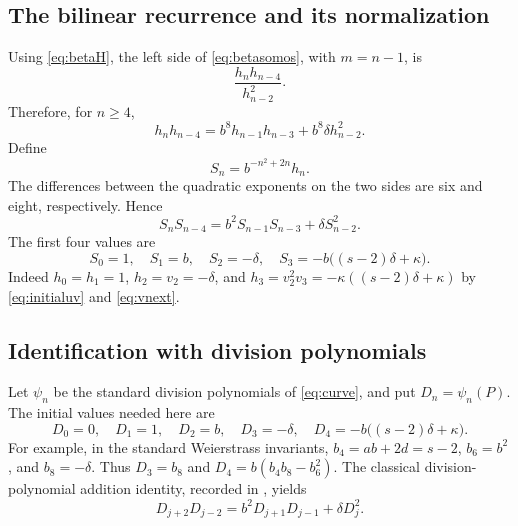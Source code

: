 \documentclass[11pt,letterpaper]{article}
\numberwithin{equation}{section}
\theoremstyle{definition}
\theoremstyle{remark}
\begin{document}
\subsection{The bilinear recurrence and its normalization}
Using \eqref{eq:betaH}, the left side of \eqref{eq:betasomos}, with
$m=n-1$, is
\[
 \frac{h_nh_{n-4}}{h_{n-2}^2}.
\]
Therefore, for $n\ge4$,
\begin{equation}\label{eq:hSomos}
 h_nh_{n-4}=b^8h_{n-1}h_{n-3}+b^8\delta h_{n-2}^2.
\end{equation}
Define
\begin{equation}\label{eq:S}
 S_n=b^{-n^2+2n}h_n.
\end{equation}
The differences between the quadratic exponents on the two sides are
six and eight, respectively. Hence
\begin{equation}\label{eq:SSomos}
 S_nS_{n-4}=b^2S_{n-1}S_{n-3}+\delta S_{n-2}^2.
\end{equation}
The first four values are
\begin{equation}\label{eq:Sinit}
 S_0=1,\quad S_1=b,\quad S_2=-\delta,\quad
 S_3=-b\bigl((s-2)\delta+\kappa\bigr).
\end{equation}
Indeed $h_0=h_1=1$, $h_2=v_2=-\delta$, and
$h_3=v_2^2v_3=-\kappa((s-2)\delta+\kappa)$ by
\eqref{eq:initialuv} and \eqref{eq:vnext}.

\subsection{Identification with division polynomials}
Let $\psi_n$ be the standard division polynomials of \eqref{eq:curve},
and put $D_n=\psi_n(P)$. The initial values needed here are
\begin{equation}\label{eq:Dinit}
 D_0=0,\quad D_1=1,\quad D_2=b,\quad D_3=-\delta,\quad
 D_4=-b\bigl((s-2)\delta+\kappa\bigr).
\end{equation}
For example, in the standard Weierstrass invariants,
$b_4=ab+2d=s-2$, $b_6=b^2$, and $b_8=-\delta$.
Thus $D_3=b_8$ and $D_4=b(b_4b_8-b_6^2)$.
The classical division-polynomial addition identity, recorded in
\cite[Equation~(5.5)]{LWZ2026}, yields
\begin{equation}\label{eq:DSomos}
 D_{j+2}D_{j-2}=b^2D_{j+1}D_{j-1}+\delta D_j^2.
\end{equation}
\end{document}

